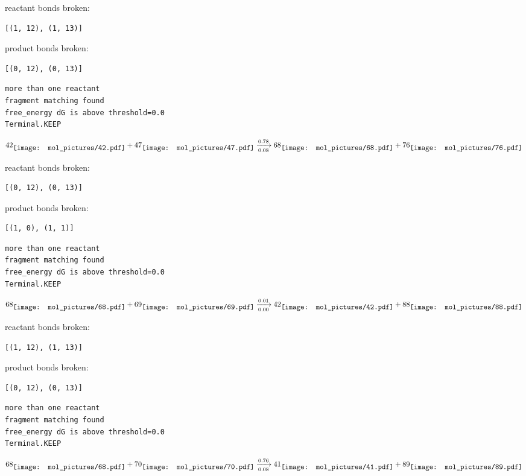 \documentclass{article}
\begin{document}
reactant bonds broken:\begin{verbatim}
[(1, 12), (1, 13)]
\end{verbatim}
product bonds broken:\begin{verbatim}
[(0, 12), (0, 13)]
\end{verbatim}




\vspace{1cm}
\begin{verbatim}
more than one reactant
fragment matching found
free_energy dG is above threshold=0.0
Terminal.KEEP
\end{verbatim}
$$
42
\raisebox{-.5\height}{\texttt{[image: mol\_pictures/42.pdf]}}
+
47
\raisebox{-.5\height}{\texttt{[image: mol\_pictures/47.pdf]}}
\xrightarrow[0.08]{0.78}
68
\raisebox{-.5\height}{\texttt{[image: mol\_pictures/68.pdf]}}
+
76
\raisebox{-.5\height}{\texttt{[image: mol\_pictures/76.pdf]}}
$$


reactant bonds broken:\begin{verbatim}
[(0, 12), (0, 13)]
\end{verbatim}
product bonds broken:\begin{verbatim}
[(1, 0), (1, 1)]
\end{verbatim}




\vspace{1cm}
\begin{verbatim}
more than one reactant
fragment matching found
free_energy dG is above threshold=0.0
Terminal.KEEP
\end{verbatim}
$$
68
\raisebox{-.5\height}{\texttt{[image: mol\_pictures/68.pdf]}}
+
69
\raisebox{-.5\height}{\texttt{[image: mol\_pictures/69.pdf]}}
\xrightarrow[0.00]{0.01}
42
\raisebox{-.5\height}{\texttt{[image: mol\_pictures/42.pdf]}}
+
88
\raisebox{-.5\height}{\texttt{[image: mol\_pictures/88.pdf]}}
$$


reactant bonds broken:\begin{verbatim}
[(1, 12), (1, 13)]
\end{verbatim}
product bonds broken:\begin{verbatim}
[(0, 12), (0, 13)]
\end{verbatim}




\vspace{1cm}
\begin{verbatim}
more than one reactant
fragment matching found
free_energy dG is above threshold=0.0
Terminal.KEEP
\end{verbatim}
$$
68
\raisebox{-.5\height}{\texttt{[image: mol\_pictures/68.pdf]}}
+
70
\raisebox{-.5\height}{\texttt{[image: mol\_pictures/70.pdf]}}
\xrightarrow[0.08]{0.76}
41
\raisebox{-.5\height}{\texttt{[image: mol\_pictures/41.pdf]}}
+
89
\raisebox{-.5\height}{\texttt{[image: mol\_pictures/89.pdf]}}
$$
\end{document}
